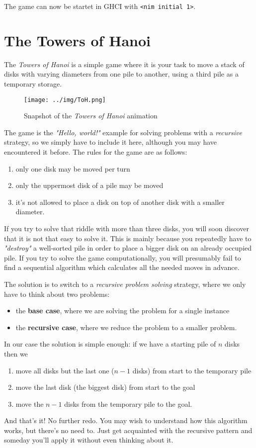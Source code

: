 The game can now be startet in GHCI with \texttt{<nim initial 1>}.

\section{The Towers of Hanoi}

The \emph{Towers of Hanoi} is a simple game where it is your task to move a stack of disks with varying diameters from one pile to another, using a third pile as a temporary storage.

\begin{figure}[ht]
\centering
\texttt{[image: ../img/ToH.png]}
\caption[Towers of Hanoi]{Snapshot of the \emph{Towers of Hanoi} animation}
\end{figure}

The game is the \emph{"Hello, world!"} example for solving problems with a \emph{recursive} strategy, so we simply have to include it here, although you may have encountered it before.
The rules for the game are as follows:
\begin{enumerate}
\item only one disk may be moved per turn
\item only the uppermost disk of a pile may be moved
\item it's not allowed to place a disk on top of another disk with a smaller diameter.
\end{enumerate}
If you try to solve that riddle with more than three disks, you will soon discover that it is not that easy to solve it.
This is mainly because you repeatedly have to \emph{"destroy"} a well-sorted pile in order to place a bigger disk on an already occupied pile.
If you try to solve the game computationally, you will presumably fail to find a sequential algorithm which calculates all the needed moves in advance.

The solution is to switch to a \emph{recursive problem solving} strategy, where we only have to think about two problems:
\begin{itemize}
\item the \textbf{base case}, where we are solving the problem for a single instance
\item the \textbf{recursive case}, where we reduce the problem to a smaller problem.
\end{itemize}
In our case the solution is simple enough: if we have a starting pile of $n$ disks then we
\begin{enumerate}
\item move all disks but the last one ($n-1$ disks) from start to the temporary pile
\item move the last disk (the biggest disk) from start to the goal
\item move the $n-1$ disks from the temporary pile to the goal.
\end{enumerate}
And that's it! No further redo.
You may wish to understand how this algorithm works, but there's no need to. Just get acquainted with the recursive pattern and someday you'll apply it without even thinking about it.

